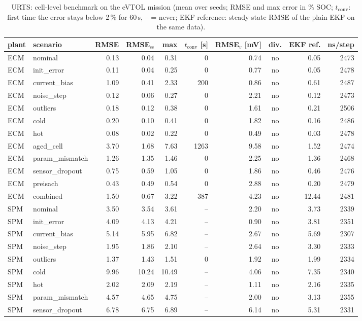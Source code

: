 \begin{table}[H]\centering\footnotesize\setlength{\tabcolsep}{4pt}
\caption{URTS: cell-level benchmark on the eVTOL mission (mean over seeds; RMSE and max error in \% SOC; $t_\mathrm{conv}$: first time the error stays below 2\,\% for 60\,s, -- = never; EKF reference: steady-state RMSE of the plain EKF on the same data).}\label{tab:cell_URTS}
\begin{tabular}{llrrrrrcrr}\toprule
plant & scenario & RMSE & RMSE$_\mathrm{ss}$ & max & $t_\mathrm{conv}$ [s] & RMSE$_v$ [mV] & div. & EKF ref. & ns/step \\ \midrule
ECM & nominal & 0.13 & 0.04 & 0.31 & 0 & 0.74 & no & 0.05 & 2473 \\
ECM & init\_error & 0.11 & 0.04 & 0.25 & 0 & 0.77 & no & 0.05 & 2478 \\
ECM & current\_bias & 1.09 & 0.41 & 2.33 & 200 & 0.86 & no & 0.61 & 2487 \\
ECM & noise\_step & 0.12 & 0.06 & 0.27 & 0 & 2.21 & no & 0.12 & 2473 \\
ECM & outliers & 0.18 & 0.12 & 0.38 & 0 & 1.61 & no & 0.21 & 2506 \\
ECM & cold & 0.20 & 0.10 & 0.41 & 0 & 1.82 & no & 0.16 & 2486 \\
ECM & hot & 0.08 & 0.02 & 0.22 & 0 & 0.49 & no & 0.03 & 2478 \\
ECM & aged\_cell & 3.70 & 1.68 & 7.63 & 1263 & 9.58 & no & 1.52 & 2474 \\
ECM & param\_mismatch & 1.26 & 1.35 & 1.46 & 0 & 2.25 & no & 1.36 & 2468 \\
ECM & sensor\_dropout & 0.75 & 0.59 & 1.05 & 0 & 1.86 & no & 0.46 & 2476 \\
ECM & preisach & 0.43 & 0.49 & 0.54 & 0 & 2.88 & no & 0.20 & 2479 \\
ECM & combined & 1.50 & 0.67 & 3.22 & 387 & 4.23 & no & 12.44 & 2481 \\
\midrule
SPM & nominal & 3.50 & 3.54 & 3.61 & -- & 2.20 & no & 3.73 & 2339 \\
SPM & init\_error & 4.09 & 4.13 & 4.21 & -- & 0.90 & no & 3.81 & 2351 \\
SPM & current\_bias & 5.14 & 5.95 & 6.82 & -- & 2.67 & no & 5.69 & 2307 \\
SPM & noise\_step & 1.95 & 1.86 & 2.10 & -- & 2.64 & no & 3.30 & 2333 \\
SPM & outliers & 1.37 & 1.43 & 1.51 & 0 & 1.92 & no & 1.99 & 2334 \\
SPM & cold & 9.96 & 10.24 & 10.49 & -- & 4.06 & no & 7.35 & 2340 \\
SPM & hot & 2.02 & 2.09 & 2.19 & -- & 1.11 & no & 2.16 & 2335 \\
SPM & param\_mismatch & 4.57 & 4.65 & 4.75 & -- & 2.00 & no & 3.13 & 2355 \\
SPM & sensor\_dropout & 6.78 & 6.75 & 6.89 & -- & 6.14 & no & 5.31 & 2331 \\
\bottomrule\end{tabular}\end{table}

